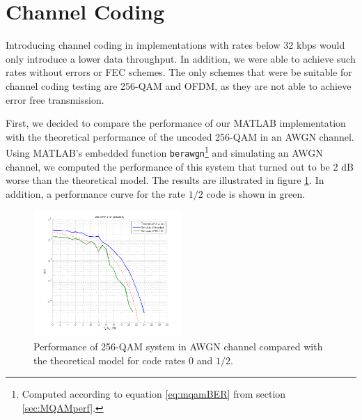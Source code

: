 \documentclass[12pt,a4paper,openright]{report}
\begin{document}
\section{Channel Coding}
\label{sec:chancodresults}

Introducing channel coding in implementations with rates below 32 kbps would only introduce a lower data throughput. In addition, we were able to achieve such rates without errors or FEC schemes. The only schemes that were be suitable for channel coding testing are 256-QAM and OFDM, as they are not able to achieve error free transmission. 
  
First, we decided to compare the performance of our MATLAB implementation with the theoretical performance of the uncoded 256-QAM in an AWGN channel. Using MATLAB's embedded function \texttt{berawgn}\footnote{Computed according to equation \ref{eq:mqamBER} from section \ref{sec:MQAMperf}.} and simulating an AWGN channel, we computed the performance of this system that turned out to be 2 dB worse than the theoretical model. The results are illustrated in figure \ref{fig:MQAMperf}. In addition, a performance curve for the rate $1/2$ code is shown in green.

 \begin{figure}[H]
  \centering
    \includegraphics[width=0.5\textwidth]{BERmix.png}
    \caption[Performance of 256-QAM system in AWGN channel.]{Performance of 256-QAM system in AWGN channel compared with the theoretical model for code rates 0 and $1/2$.}
    \label{fig:MQAMperf}
\end{figure}
\end{document}
